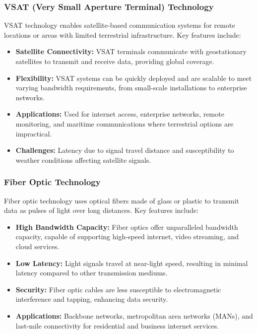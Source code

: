 \documentclass[a4paper,12pt]{report}
\begin{document}
	\subsubsection{VSAT (Very Small Aperture Terminal) Technology}
	VSAT technology enables satellite-based communication systems for remote locations or areas with limited terrestrial infrastructure. Key features include:
	
	\begin{itemize}
		\item \textbf{Satellite Connectivity:} VSAT terminals communicate with geostationary satellites to transmit and receive data, providing global coverage.
		\item \textbf{Flexibility:} VSAT systems can be quickly deployed and are scalable to meet varying bandwidth requirements, from small-scale installations to enterprise networks.
		\item \textbf{Applications:} Used for internet access, enterprise networks, remote monitoring, and maritime communications where terrestrial options are impractical.
		\item \textbf{Challenges:} Latency due to signal travel distance and susceptibility to weather conditions affecting satellite signals.
	\end{itemize}
	
	\subsubsection{Fiber Optic Technology}
	Fiber optic technology uses optical fibers made of glass or plastic to transmit data as pulses of light over long distances. Key features include:
	
	\begin{itemize}
		\item \textbf{High Bandwidth Capacity:} Fiber optics offer unparalleled bandwidth capacity, capable of supporting high-speed internet, video streaming, and cloud services.
		\item \textbf{Low Latency:} Light signals travel at near-light speed, resulting in minimal latency compared to other transmission mediums.
		\item \textbf{Security:} Fiber optic cables are less susceptible to electromagnetic interference and tapping, enhancing data security.
		\item \textbf{Applications:} Backbone networks, metropolitan area networks (MANs), and last-mile connectivity for residential and business internet services.
	\end{itemize}
	
\end{document}
